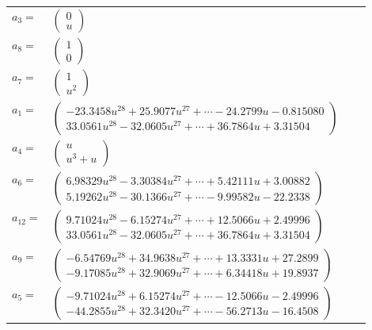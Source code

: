 \documentclass[1p]{elsarticle_modified}
\theoremstyle{definition}
\begin{document}
\begin{tabular}{m{7pt} m{180pt} m{7pt} m{180pt} }
\flushright $a_{3}=$&$\begin{pmatrix}0\\u\end{pmatrix}$ \\
\flushright $a_{8}=$&$\begin{pmatrix}1\\0\end{pmatrix}$ \\
\flushright $a_{7}=$&$\begin{pmatrix}1\\u^2\end{pmatrix}$ \\
\flushright $a_{1}=$&$\begin{pmatrix}-23.3458 u^{28}+25.9077 u^{27}+\cdots-24.2799 u-0.815080\\33.0561 u^{28}-32.0605 u^{27}+\cdots+36.7864 u+3.31504\end{pmatrix}$ \\
\flushright $a_{4}=$&$\begin{pmatrix}u\\u^3+u\end{pmatrix}$ \\
\flushright $a_{6}=$&$\begin{pmatrix}6.98329 u^{28}-3.30384 u^{27}+\cdots+5.42111 u+3.00882\\5.19262 u^{28}-30.1366 u^{27}+\cdots-9.99582 u-22.2338\end{pmatrix}$ \\
\flushright $a_{12}=$&$\begin{pmatrix}9.71024 u^{28}-6.15274 u^{27}+\cdots+12.5066 u+2.49996\\33.0561 u^{28}-32.0605 u^{27}+\cdots+36.7864 u+3.31504\end{pmatrix}$ \\
\flushright $a_{9}=$&$\begin{pmatrix}-6.54769 u^{28}+34.9638 u^{27}+\cdots+13.3331 u+27.2899\\-9.17085 u^{28}+32.9069 u^{27}+\cdots+6.34418 u+19.8937\end{pmatrix}$ \\
\flushright $a_{5}=$&$\begin{pmatrix}-9.71024 u^{28}+6.15274 u^{27}+\cdots-12.5066 u-2.49996\\-44.2855 u^{28}+32.3420 u^{27}+\cdots-56.2713 u-16.4508\end{pmatrix}$ \\

\end{tabular}
\end{document}
